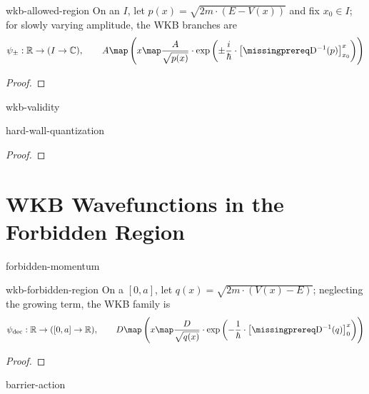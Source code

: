 \documentclass[12pt]{article}
\begin{document}
\begin{thm}{wkb-allowed-region}
  On an  $I$, let $p(x)=\sqrt{2m\cdot(E-V(x))}$ and fix $x_0\in I$; for slowly varying amplitude, the WKB branches are
  \[
    \psi_{\pm}:\mathbb R\to(I\to\mathbb C),\qquad
    A\map\left(x\map\frac{A}{\sqrt{p(x)}}\cdot
    \exp\left(\pm\frac{i}{\hbar}\cdot
    \left[\DiffOp^{-1}(p)\right]_{x_0}^{x}\right)\right)
  \]
\end{thm}

\begin{proof}
  \todo
\end{proof}

\begin{rem}{wkb-validity}
  \todo
\end{rem}

\begin{thm}{hard-wall-quantization}
  \todo
\end{thm}

\begin{proof}
  \todo
\end{proof}

\section{WKB Wavefunctions in the Forbidden Region}

\begin{dfn}{forbidden-momentum}
  \todo
\end{dfn}

\begin{thm}{wkb-forbidden-region}
  On a  $[0,a]$, let $q(x)=\sqrt{2m\cdot(V(x)-E)}$; neglecting the growing term, the WKB family is
  \[
    \psi_{\mathrm{dec}}:\mathbb R\to([0,a]\to\mathbb R),\qquad
    D\map\left(x\map\frac{D}{\sqrt{q(x)}}\cdot
    \exp\left(-\frac{1}{\hbar}\cdot
    \left[\DiffOp^{-1}(q)\right]_{0}^{x}\right)\right)
  \]
\end{thm}

\begin{proof}
  \todo
\end{proof}

\begin{dfn}{barrier-action}
  \todo
\end{dfn}
\end{document}
